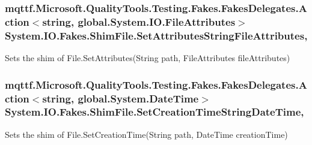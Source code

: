 \hypertarget{class_system_1_1_i_o_1_1_fakes_1_1_shim_file_a727508e1204c7f5e1042a3ef7acb5541}{
\subsubsection[{Set\-Attributes\-String\-File\-Attributes}]{\setlength{\rightskip}{0pt plus 5cm}mqttf.\-Microsoft.\-Quality\-Tools.\-Testing.\-Fakes.\-Fakes\-Delegates.\-Action$<$string, global.\-System.\-I\-O.\-File\-Attributes$>$ System.\-I\-O.\-Fakes.\-Shim\-File.\-Set\-Attributes\-String\-File\-Attributes\hspace{0.3cm}{\ttfamily [static]}, {\ttfamily [set]}}}\label{class_system_1_1_i_o_1_1_fakes_1_1_shim_file_a727508e1204c7f5e1042a3ef7acb5541}


Sets the shim of File.\-Set\-Attributes(\-String path, File\-Attributes file\-Attributes)

\hypertarget{class_system_1_1_i_o_1_1_fakes_1_1_shim_file_ae101b5b3b0cd7120074bff9234915378}{
\subsubsection[{Set\-Creation\-Time\-String\-Date\-Time}]{\setlength{\rightskip}{0pt plus 5cm}mqttf.\-Microsoft.\-Quality\-Tools.\-Testing.\-Fakes.\-Fakes\-Delegates.\-Action$<$string, global.\-System.\-Date\-Time$>$ System.\-I\-O.\-Fakes.\-Shim\-File.\-Set\-Creation\-Time\-String\-Date\-Time\hspace{0.3cm}{\ttfamily [static]}, {\ttfamily [set]}}}\label{class_system_1_1_i_o_1_1_fakes_1_1_shim_file_ae101b5b3b0cd7120074bff9234915378}


Sets the shim of File.\-Set\-Creation\-Time(\-String path, Date\-Time creation\-Time)

